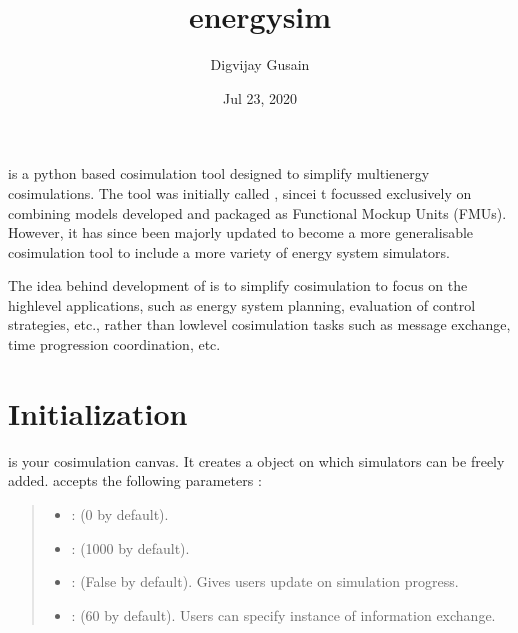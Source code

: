 \documentclass[letterpaper,10pt,english]{sphinxmanual}
\title{energysim}
\date{Jul 23, 2020}
\author{Digvijay Gusain}
\begin{document}
\pagestyle{empty}
\sphinxmaketitle
\pagestyle{plain}
\sphinxtableofcontents
\pagestyle{normal}
\label{\detokenize{index::doc}}


 is a python based cosimulation tool designed to simplify multi\sphinxhyphen{}energy cosimulations. The tool was initially called , sincei t focussed exclusively on combining models developed and packaged as Functional Mockup Units (FMUs). However, it has since been majorly updated to become a more generalisable cosimulation tool to include a more variety of energy system simulators.

The idea behind development of  is to simplify cosimulation to focus on the high\sphinxhyphen{}level applications, such as energy system planning, evaluation of control strategies, etc., rather than low\sphinxhyphen{}level cosimulation tasks such as message exchange, time progression coordination, etc.


\chapter{Initialization}
\label{\detokenize{index:initialization}}
 is your cosimulation canvas. It creates a  object on which simulators can be freely added.  accepts the following parameters :
\begin{quote}
\begin{itemize}
\item {} 
 : (0 by default).

\item {} 
 : (1000 by default).

\item {} 
 : (False by default). Gives users update on simulation progress.

\item {} 
 : (60 by default). Users can specify instance of information exchange.

\end{itemize}

\begin{sphinxVerbatim}[commandchars=\\\{\}]
     
\end{sphinxVerbatim}
\end{quote}
\end{document}

